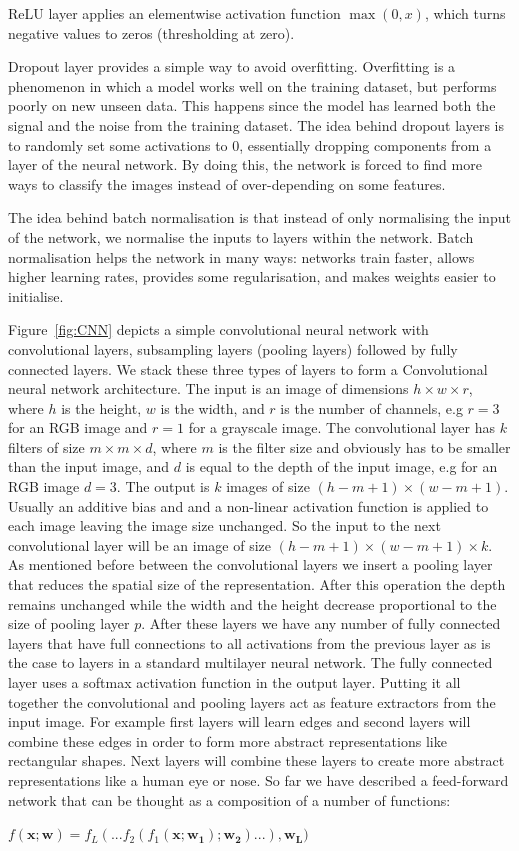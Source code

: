 ReLU layer applies an elementwise activation function $\max(0,x)$, which turns negative values to zeros (thresholding at zero). 

Dropout layer provides a simple way to avoid overfitting. Overfitting is a phenomenon in which a model works well on the training dataset, but performs poorly on new unseen data. This happens since the model has learned both the signal and the noise from the training dataset. The idea behind dropout layers is to randomly set some activations to 0, essentially dropping components from a layer of the neural network. By doing this, the network is forced to find more ways to classify the images instead of over-depending on some features.

The idea behind batch normalisation is that instead of only normalising the input of the network, we normalise the inputs to layers within the network. Batch normalisation helps the network in many ways: networks train faster, allows higher learning rates, provides some regularisation, and makes weights easier to initialise. 

Figure~\ref{fig:CNN} depicts a simple convolutional neural network with convolutional layers, subsampling layers (pooling layers) followed by fully connected layers. We stack these three types of layers to form a Convolutional neural network architecture. The input is an image of dimensions $h\times w \times r$, where $h$ is the height, $w$ is the width, and $r$ is the number of channels, e.g $r=3$ for an RGB image and $r=1$ for a grayscale image. The convolutional layer has $k$ filters of size $m\times m \times d$, where $m$ is the filter size and obviously has to be smaller than the input image, and $d$ is equal to the depth of the input image, e.g for an RGB image $d=3$. The output is $k$ images of size $(h-m+1) \times (w-m+1)$. Usually an additive bias and and a non-linear activation function is applied to each image leaving the image  size unchanged. So the input to the next convolutional layer will be an image of size $(h-m+1) \times (w-m+1) \times k$. As mentioned before between the convolutional layers we insert a pooling layer that reduces the spatial size of the representation. After this operation the depth remains unchanged while the width and the height decrease proportional to the size of pooling layer $p$. After these layers we have any number of fully connected layers that have full connections to all activations from the previous layer as is the case to layers in a standard multilayer neural network. The fully connected layer uses a softmax activation function in the output layer. Putting it all together the convolutional and pooling layers act as feature extractors from the input image. For example first layers will learn edges and second layers will combine these edges in order to form more abstract representations like rectangular shapes. Next layers will combine these layers to create more abstract representations like a human eye or nose. So far we have described a feed-forward network that can be thought as a composition of a number of functions:
\begin{center}
$f(\mathbf{x;w}) = f_{L}(...f_{2}(f_{1}(\mathbf{x;w_{1}});\mathbf{w_{2}})...),\mathbf{w_{L}})$
\end{center}

